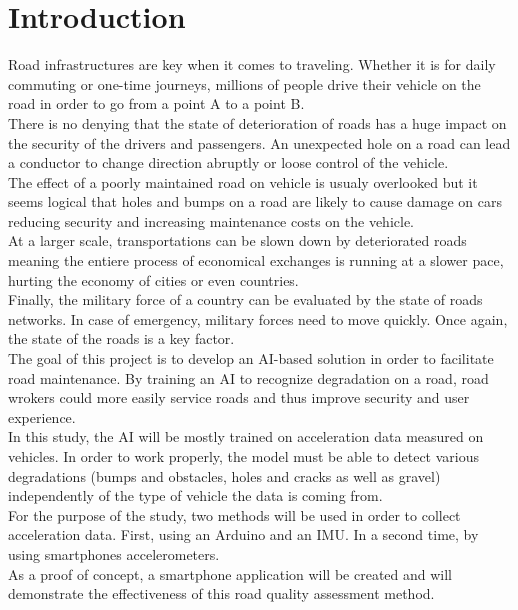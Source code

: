 \section{Introduction}
Road infrastructures are key when it comes to traveling. Whether it is for daily commuting or one-time journeys, millions of people drive their vehicle on the road in order to go from a point A to a point B.\\
There is no denying that the state of deterioration of roads has a huge impact on the security of the drivers and passengers. An unexpected hole on a road can lead a conductor to change direction abruptly or loose control of the vehicle.\\
The effect of a poorly maintained road on vehicle is usualy overlooked but it seems logical that holes and bumps on a road are likely to cause damage on cars reducing security and increasing maintenance costs on the vehicle.\\
At a larger scale, transportations can be slown down by deteriorated roads meaning the entiere process of economical exchanges is running at a slower pace, hurting the economy of cities or even countries.\\
Finally, the military force of a country can be evaluated by the state of roads networks. In case of emergency, military forces need to move quickly. Once again, the state of the roads is a key factor.\\

The goal of this project is to develop an AI-based solution in order to facilitate road maintenance. By training an AI to recognize degradation on a road, road wrokers could more easily service roads and thus improve security and user experience.\\
In this study, the AI will be mostly trained on acceleration data measured on vehicles. In order to work properly, the model must be able to detect various degradations (bumps and obstacles, holes and cracks as well as gravel) independently of the type of vehicle the data is coming from.\\
For the purpose of the study, two methods will be used in order to collect acceleration data. First, using an Arduino and an IMU. In a second time, by using smartphones accelerometers.
\\
As a proof of concept, a smartphone application will be created and will demonstrate the effectiveness of this road quality assessment method.\\